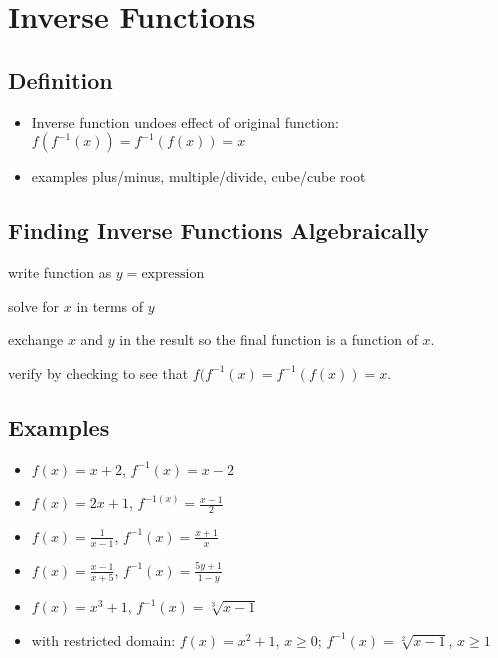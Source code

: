 \documentclass{exam}
\begin{document}
\section{Inverse Functions}
\subsection{Definition}
\begin{itemize}
  \item Inverse function undoes effect of original function: $f(f^{-1}(x)) = f^{-1}(f(x)) = x$
  \item examples plus/minus, multiple/divide, cube/cube root 
\end{itemize}

\subsection{Finding Inverse Functions Algebraically}
\begin{itemize*}
  \item write function as $y = \text{expression}$
  \item solve for $x$ in terms of $y$
  \item exchange $x$ and $y$ in the result so the final function is a function of $x$.
  \item verify by checking to see that $f(f^{-1}(x) = f^{-1}(f(x)) = x$.
\end{itemize*}

\subsection{Examples}
\begin{itemize}
  \item $f(x) = x + 2$, $f^{-1}(x) = x - 2$
    
  \item $f(x) = 2x + 1$, $f^{-1(x)} = \frac{x - 1}{2}$  
    
  \item $f(x) = \frac{1}{x - 1}$, $f^{-1}(x) = \frac{x + 1}{x}$

  \item $f(x) = \frac{x - 1}{x + 5}$, $f^{-1}(x) = \frac{5y + 1}{1 - y}$

  \item $f(x) = x^3 + 1$, $f^{-1}(x) = \sqrt[3]{x - 1}$

  \item with restricted domain: $f(x) = x^2 + 1$, $x \geq 0$; $f^{-1}(x) = \sqrt[2]{x - 1}$, $x \geq 1$

\end{itemize}
\end{document}

